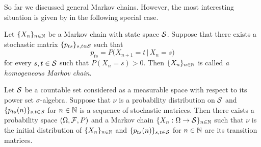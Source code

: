 So far we discussed general Markov chains. However, the most interesting situation is given by in the following special case.

\begin{definition}
Let $\{X_n\}_{n\in {\mathbb N}}$ be a Markov chain with state space ${\mathcal S}$. Suppose that there exists a stochastic matrix $\{p_{ts}\}_{s,t\in {\mathcal S}}$ such that
$$p_{ts} = P\big(X_{n+1} = t\,\big|\,X_n = s\big)$$
for every $s,t\in {\mathcal S}$ such that $P(X_n=s)>0$. Then $\{X_n\}_{n\in {\mathbb N}}$ is called \textit{a homogeneous Markov chain}.
\end{definition}

\begin{theorem}\label{theorem:existence_of_Markov_chain_with_given_initial_distribution_and_transition_matrices}
Let ${\mathcal S}$ be a countable set considered as a measurable space with respect to its power set $\sigma$-algebra. Suppose that $\nu$ is a probability distribution on ${\mathcal S}$ and $\{p_{ts}(n)\}_{s,t\in {\mathcal S}}$ for $n\in {\mathbb N}$ is a sequence of stochastic matrices. Then there exists a probability space $(\Omega,{\mathcal F},P)$ and a Markov chain $\{X_n:\Omega\rightarrow {\mathcal S}\}_{n\in {\mathbb N}}$ such that $\nu$ is the initial distribution of $\{X_n\}_{n\in {\mathbb N}}$ and $\{p_{ts}(n)\}_{s,t\in {\mathcal S}}$ for $n\in {\mathbb N}$ are its transition matrices.
\end{theorem}
